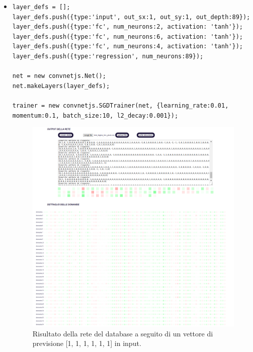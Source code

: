 \begin{itemize}
\item \begin{verbatim}
layer_defs = [];
layer_defs.push({type:'input', out_sx:1, out_sy:1, out_depth:89});
layer_defs.push({type:'fc', num_neurons:2, activation: 'tanh'});
layer_defs.push({type:'fc', num_neurons:6, activation: 'tanh'});
layer_defs.push({type:'fc', num_neurons:4, activation: 'tanh'});
layer_defs.push({type:'regression', num_neurons:89});

net = new convnetjs.Net();
net.makeLayers(layer_defs);

trainer = new convnetjs.SGDTrainer(net, {learning_rate:0.01,
momentum:0.1, batch_size:10, l2_decay:0.001});
\end{verbatim}

\begin{figure}[H]
\centering
	\includegraphics[width=0.90\linewidth]{./image/rete_db-vp1.png}
	\caption{Risultato della rete del database a seguito di un vettore di previsione [1, 1, 1, 1, 1, 1] in input.}
	\label{Risultato della rete del database a seguito di un vettore di previsione [1, 1, 1, 1, 1, 1] in input.}
\end{figure}


\end{itemize}

